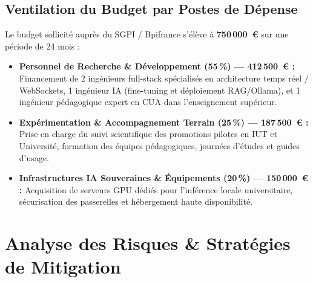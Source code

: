 \documentclass[11pt,a4paper]{article}
\begin{document}
\subsection{Ventilation du Budget par Postes de Dépense}
Le budget sollicité auprès du SGPI / Bpifrance s'élève à \textbf{750\,000~€} sur une période de 24 mois :
\begin{itemize}[leftmargin=1.5em, itemsep=3pt]
    \item \textbf{Personnel de Recherche \& Développement (55\,\%) --- 412\,500~€ :}
    Financement de 2 ingénieurs full-stack spécialisés en architecture temps réel / WebSockets, 1 ingénieur IA (fine-tuning et déploiement RAG/Ollama), et 1 ingénieur pédagogique expert en CUA dans l'enseignement supérieur.
    \item \textbf{Expérimentation \& Accompagnement Terrain (25\,\%) --- 187\,500~€ :}
    Prise en charge du suivi scientifique des promotions pilotes en IUT et Université, formation des équipes pédagogiques, journées d'études et guides d'usage.
    \item \textbf{Infrastructures IA Souveraines \& Équipements (20\,\%) --- 150\,000~€ :}
    Acquisition de serveurs GPU dédiés pour l'inférence locale universitaire, sécurisation des passerelles et hébergement haute disponibilité.
\end{itemize}

\section{Analyse des Risques \& Stratégies de Mitigation}
\end{document}
